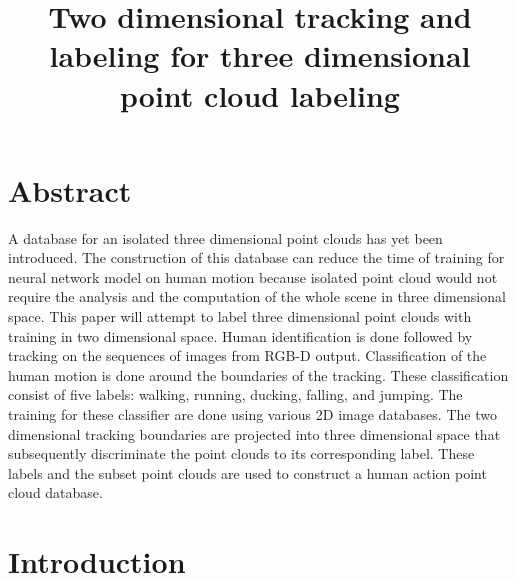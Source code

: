 \documentclass[a4paper, 10pt]{article}
\title{Two dimensional tracking and labeling for three dimensional point cloud labeling}
\begin{document}
\maketitle
\section{Abstract}
A database for an isolated three dimensional point clouds has yet been introduced. 
The construction of this database can reduce the time of training for neural network
model on human motion because isolated point cloud would not require the analysis and 
the computation of the whole scene in three dimensional space. 
This paper will attempt to label three dimensional point clouds with training
in two dimensional space.
Human identification is done followed by tracking on the sequences of images from
RGB-D output. Classification of the human motion is done around the boundaries
of the tracking. These classification consist of five labels: walking, running,
ducking, falling, and jumping. The training for these classifier are done using
various 2D image databases. The two dimensional tracking boundaries are
projected into three dimensional space that subsequently discriminate the point
clouds to its corresponding label. These labels and the subset point clouds are
used to construct a human action point cloud database. 

\section{Introduction}
\end{document}
